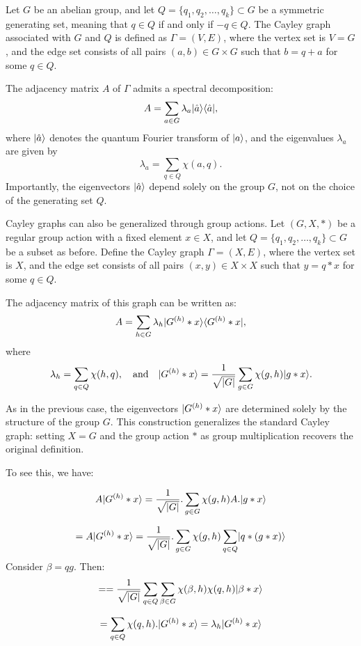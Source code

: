 \documentclass[11pt]{article}
\theoremstyle{definition}
\begin{document}
Let \( G \) be an abelian group, and let \( Q = \{q_1, q_2, \dots, q_k\} \subset G \) be a symmetric generating set, meaning that \( q \in Q \) if and only if \( -q \in Q \). The Cayley graph associated with \( G \) and \( Q \) is defined as \( \Gamma = (V, E) \), where the vertex set is \( V = G \), and the edge set consists of all pairs \( (a, b) \in G \times G \) such that \( b = q + a \) for some \( q \in Q \).

The adjacency matrix \( A \) of \( \Gamma \) admits a spectral decomposition:
\[
A = \sum_{a \in G} \lambda_a \lvert\hat{a}\rangle \langle\hat{a}\rvert,
\]
where \( \lvert\hat{a}\rangle \) denotes the quantum Fourier transform of \( \lvert a\rangle \), and the eigenvalues \( \lambda_a \) are given by
\[
\lambda_a = \sum_{q \in Q} \chi(a, q).
\]
Importantly, the eigenvectors \( \lvert\hat{a}\rangle \) depend solely on the group \( G \), not on the choice of the generating set \( Q \).

Cayley graphs can also be generalized through group actions. Let \( (G, X, *) \) be a regular group action with a fixed element \( x \in X \), and let \( Q = \{q_1, q_2, \dots, q_k\} \subset G \) be a subset as before. Define the Cayley graph \( \Gamma = (X, E) \), where the vertex set is \( X \), and the edge set consists of all pairs \( (x, y) \in X \times X \) such that \( y = q * x \) for some \( q \in Q \).

The adjacency matrix of this graph can be written as:
\[
A = \sum_{h \in G} \lambda_h \lvert G^{(h)} * x\rangle \langle G^{(h)} * x\rvert,
\]
where
\[
\lambda_h = \sum_{q \in Q} \chi(h, q), \quad \text{and} \quad \lvert G^{(h)} * x\rangle = \frac{1}{\sqrt{|G|}} \sum_{g \in G} \chi(g, h) \lvert g * x\rangle.
\]

As in the previous case, the eigenvectors \( \lvert G^{(h)} * x\rangle \) are determined solely by the structure of the group \( G \). This construction generalizes the standard Cayley graph: setting \( X = G \) and the group action \( * \) as group multiplication recovers the original definition.


To see this, we have:

\[
    A\lvert G^{(h)}*x\rangle = \frac{1}{\sqrt{|G|}}.\sum_{g \in G}\chi(g,h) A.\lvert g*x\rangle
    \]

    \[
    = A\lvert G^{(h)}*x\rangle = \frac{1}{\sqrt{|G|}}.\sum_{g \in G}\chi(g,h)\sum_{q \in Q}\lvert q*(g*x)\rangle
    \]
    Consider $\beta = qg$. Then:
    \[
    = = \frac{1}{\sqrt{|G|}}\sum_{q \in Q}\sum_{\beta \in G}\chi(\beta,h)\chi(q,h)\lvert\beta * x\rangle
    \]

    \[
    = \sum_{q \in Q}\chi(q,h).\lvert G^{(h)}*x\rangle = \lambda_h \lvert G^{(h)}*x\rangle
    \]
\end{document}
